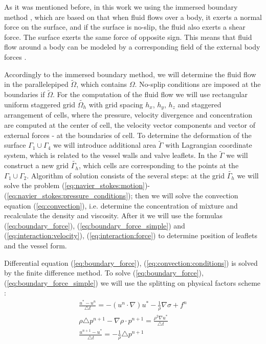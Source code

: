 \documentclass[runningheads,a4paper]{llncs}
\begin{document}
As it was mentioned before, in this work we using the immersed boundary method \cite{pescin_1977}, which are based on that when fluid flows over a body,
it exerts a normal force on the surface, and if the surface is no-slip, the fluid also exerts a shear force. The surface exerts the same force of opposite sign.
This means that fluid flow around a body can be modeled by a corresponding field of the external body forces \cite{goldstain}.

Accordingly to the immersed boundary method, we will determine the fluid flow in the parallelepiped $\tilde{\Omega}$, which contains $\Omega$.
No-splip conditions are imposed at the boundaries if $\tilde{\Omega}$.
For the computation of the fluid flow we will use rectangular uniform staggered grid $\tilde{\Omega_h}$ with grid spacing $h_x$, $h_y$, $h_z$ and 
staggered arrangement of cells, where the pressure, velocity divergence and concentration are computed at the center of cell, the velocity vector components
and vector of external forces - at the boundaries of cell. To determine the deformation of the surface $\Gamma_1 \cup \Gamma_4$ we will introduce additional
area $\tilde{\Gamma}$ with Lagrangian coordinate system, which is related to the vessel walls and valve leaflets. In the $\tilde{\Gamma}$ we will construct
a new grid $\tilde{\Gamma_h}$, which cells are corresponding to the points at the $\Gamma_1 \cup \Gamma_2$. Algorithm of solution consists of the several steps:
at the grid $\tilde{\Gamma_h}$ we will solve the problem (\ref{eq:navier_stokes:motion})-(\ref{eq:navier_stokes:pressure_conditions}); then we will solve
the convection equation (\ref{eq:convection}), i.e. determine the concentration of mixture and recalculate the density and viscosity. After it we will use
the formulas (\ref{eq:boundary_force}), (\ref{eq:boundary_force_simple}) and (\ref{eq:interaction:velocity}), (\ref{eq:interaction:force}) to determine position of
leaflets and the vessel form.

Differential equation (\ref{eq:boundary_force}), (\ref{eq:convection:conditions}) is solved by the finite difference method.
To solve (\ref{eq:boundary_force}), (\ref{eq:boundary_force_simple}) we will use the splitting on physical factors scheme \cite{belotserkovsky}:
\begin{gather}
    \label{eq:splitting:intermediate_velocity}
    \frac{u^* - u^n}{\triangle t} = - (u^n \cdot \nabla) u^* - \frac{1}{\rho} \nabla \sigma + f^n\\
    \label{eq:splitting:poisson}
    \rho \triangle p^{n+1} - \nabla \rho \cdot p^{n+1} = \frac{\rho^2 \nabla u^*}{\triangle t}\\
    \label{eq:splitting:velocity}
    \frac{u^{n+1} - u^*}{\triangle t} = - \frac{1}{\rho} \triangle p^{n+1}
\end{gather}
\end{document}
